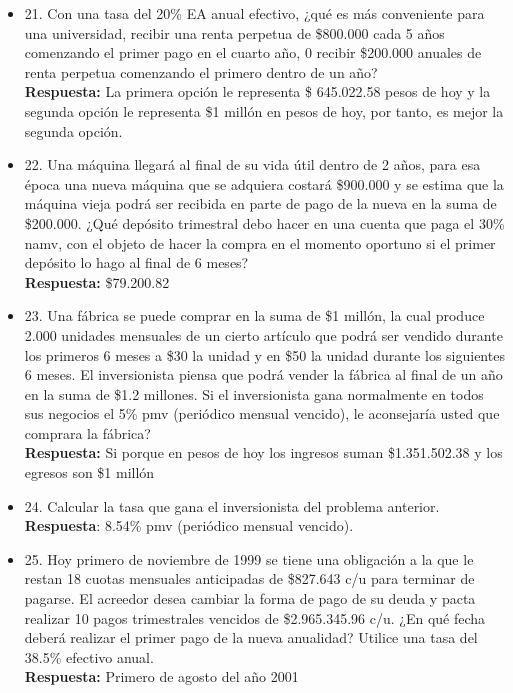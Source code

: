 \begin{itemize}
	\item 21. Con una tasa del 20\% EA anual efectivo, ¿qué es más conveniente para una universidad, recibir una renta perpetua de \$800.000 cada 5 años comenzando el primer pago en el cuarto año, 0 recibir \$200.000 anuales de renta perpetua comenzando el primero dentro de un año?\\
	\textbf{Respuesta:} La primera opción le representa \$ 645.022.58 pesos de hoy y la segunda opción le representa \$1 millón en pesos de hoy, por tanto, es mejor la segunda opción.\\
	\medskip
	
	\item 22. Una máquina llegará al final de su vida útil dentro de 2 años, para esa época una nueva máquina que se adquiera costará \$900.000 y se estima que la máquina vieja podrá ser recibida en parte de pago de la nueva en la suma de \$200.000. ¿Qué depósito trimestral debo hacer en una cuenta que paga el 30\% namv, con el objeto de hacer la compra en el momento oportuno si el primer depósito lo hago al final de 6 meses?\\
	\textbf{Respuesta:} \$79.200.82\\
	\medskip
	
	\item 23. Una fábrica se puede comprar en la suma de \$1 millón, la cual produce 2.000 unidades mensuales de un cierto artículo que podrá ser vendido durante los primeros 6 meses a \$30 la unidad y en \$50 la unidad durante los siguientes 6 meses. El inversionista piensa que podrá vender la fábrica al final de un año en la suma de \$1.2 millones. Si el inversionista gana normalmente en todos sus negocios el 5\% pmv (periódico mensual vencido), le aconsejaría usted que comprara la fábrica?\\
	\textbf{Respuesta:} Si porque en pesos de hoy los ingresos suman \$1.351.502.38 y los egresos son \$1 millón\\
	\medskip
	
	\item 24. Calcular la tasa que gana el inversionista del problema anterior.\\
	\textbf{Respuesta}: 8.54\% pmv (periódico mensual vencido).\\
	\medskip
	
	\item 25. Hoy primero de noviembre de 1999 se tiene una obligación a la que le restan 18 cuotas mensuales anticipadas de \$827.643 c/u para terminar de pagarse. El acreedor desea cambiar la forma de pago de su deuda y pacta realizar 10 pagos trimestrales vencidos de \$2.965.345.96 c/u. ¿En qué fecha deberá realizar el primer pago de la nueva anualidad? Utilice una tasa del 38.5\% efectivo anual.\\
	\textbf{Respuesta:} Primero de agosto del año 2001\\
	\medskip
	

\end{itemize}
